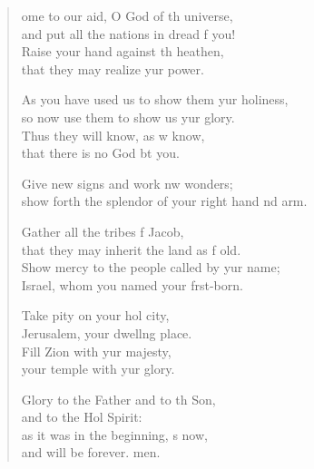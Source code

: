 \begin{verse}
  \begin{patverse}
ome to our aid, O God of th universe,\Med\\
and put all the nations in dread f you!\\
Raise your hand against th heathen,\Med\\
that they may realize yur power.

As you have used us to show them yur holiness,\Med\\
so now use them to show us yur glory.\\
Thus they will know, as w know,\Med\\
that there is no God bt you.

Give new signs and work nw wonders;\Med\\
show forth the splendor of your right hand nd arm.

Gather all the tribes f Jacob,\Med\\
that they may inherit the land as f old.\\
Show mercy to the people called by yur name;\Med\\
Israel, whom you named your f\pointup{\i}rst-born.

Take pity on your hol city,\Med\\
Jerusalem, your dwell\pointup{\i}ng place.\\
Fill Zion with yur majesty,\Med\\
your temple with yur glory.

Glory to the Father and to th Son,\Med\\
and to the Hol Spirit:\\
as it was in the beginning, \pointup{\i}s now,\Med\\
and will be forever. men. 
  \end{patverse}
\end{verse}
